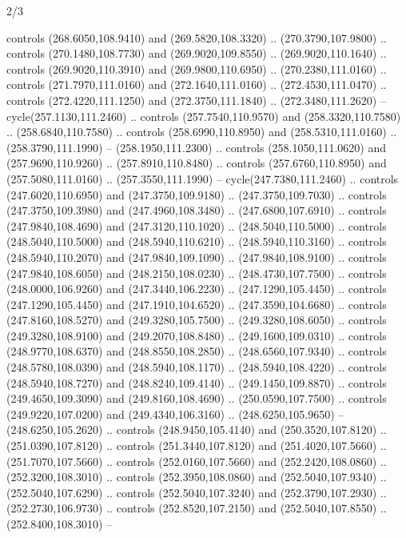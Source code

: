 \begin{flagdescription}{2/3}
\begin{scope}[xshift=0.5\flaglength,yshift=0.5\flagwidth,scale=\flagwidth/259.2]
\begin{scope}[y=0.8pt, x=0.8pt, yscale=-1,shift={(-243,-162)}]
      controls (268.6050,108.9410) and (269.5820,108.3320) .. (270.3790,107.9800) ..
      controls (270.1480,108.7730) and (269.9020,109.8550) .. (269.9020,110.1640) ..
      controls (269.9020,110.3910) and (269.9800,110.6950) .. (270.2380,111.0160) ..
      controls (271.7970,111.0160) and (272.1640,111.0160) .. (272.4530,111.0470) ..
      controls (272.4220,111.1250) and (272.3750,111.1840) .. (272.3480,111.2620) --
      cycle(257.1130,111.2460) .. controls (257.7540,110.9570) and
      (258.3320,110.7580) .. (258.6840,110.7580) .. controls (258.6990,110.8950) and
      (258.5310,111.0160) .. (258.3790,111.1990) -- (258.1950,111.2300) .. controls
      (258.1050,111.0620) and (257.9690,110.9260) .. (257.8910,110.8480) .. controls
      (257.6760,110.8950) and (257.5080,111.0160) .. (257.3550,111.1990) --
      cycle(247.7380,111.2460) .. controls (247.6020,110.6950) and
      (247.3750,109.9180) .. (247.3750,109.7030) .. controls (247.3750,109.3980) and
      (247.4960,108.3480) .. (247.6800,107.6910) .. controls (247.9840,108.4690) and
      (247.3120,110.1020) .. (248.5040,110.5000) .. controls (248.5040,110.5000) and
      (248.5940,110.6210) .. (248.5940,110.3160) .. controls (248.5940,110.2070) and
      (247.9840,109.1090) .. (247.9840,108.9100) .. controls (247.9840,108.6050) and
      (248.2150,108.0230) .. (248.4730,107.7500) .. controls (248.0000,106.9260) and
      (247.3440,106.2230) .. (247.1290,105.4450) .. controls (247.1290,105.4450) and
      (247.1910,104.6520) .. (247.3590,104.6680) .. controls (247.8160,108.5270) and
      (249.3280,105.7500) .. (249.3280,108.6050) .. controls (249.3280,108.9100) and
      (249.2070,108.8480) .. (249.1600,109.0310) .. controls (248.9770,108.6370) and
      (248.8550,108.2850) .. (248.6560,107.9340) .. controls (248.5780,108.0390) and
      (248.5940,108.1170) .. (248.5940,108.4220) .. controls (248.5940,108.7270) and
      (248.8240,109.4140) .. (249.1450,109.8870) .. controls (249.4650,109.3090) and
      (249.8160,108.4690) .. (250.0590,107.7500) .. controls (249.9220,107.0200) and
      (249.4340,106.3160) .. (248.6250,105.9650) -- (248.6250,105.2620) .. controls
      (248.9450,105.4140) and (250.3520,107.8120) .. (251.0390,107.8120) .. controls
      (251.3440,107.8120) and (251.4020,107.5660) .. (251.7070,107.5660) .. controls
      (252.0160,107.5660) and (252.2420,108.0860) .. (252.3200,108.3010) .. controls
      (252.3950,108.0860) and (252.5040,107.9340) .. (252.5040,107.6290) .. controls
      (252.5040,107.3240) and (252.3790,107.2930) .. (252.2730,106.9730) .. controls
      (252.8520,107.2150) and (252.5040,107.8550) .. (252.8400,108.3010) --

\end{scope}
\end{scope}
\end{flagdescription}
